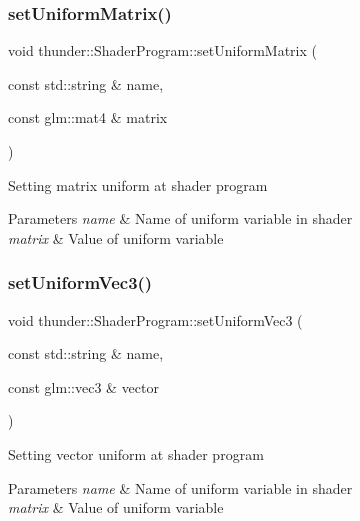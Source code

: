 \subsubsection{\texorpdfstring{set\+Uniform\+Matrix()}{setUniformMatrix()}}
{\footnotesize\ttfamily void thunder\+::\+Shader\+Program\+::set\+Uniform\+Matrix (\begin{DoxyParamCaption}\item[{const std\+::string \&}]{name,  }\item[{const glm\+::mat4 \&}]{matrix }\end{DoxyParamCaption})}

Setting matrix uniform at shader program


\begin{DoxyParams}{Parameters}
{\em name} & Name of uniform variable in shader \\
\hline
{\em matrix} & Value of uniform variable \\
\hline
\end{DoxyParams}
\mbox{\label{classthunder_1_1_shader_program_a88bff19b426a37bb610434be19e07d12}} 
\subsubsection{\texorpdfstring{set\+Uniform\+Vec3()}{setUniformVec3()}}
{\footnotesize\ttfamily void thunder\+::\+Shader\+Program\+::set\+Uniform\+Vec3 (\begin{DoxyParamCaption}\item[{const std\+::string \&}]{name,  }\item[{const glm\+::vec3 \&}]{vector }\end{DoxyParamCaption})}

Setting vector uniform at shader program


\begin{DoxyParams}{Parameters}
{\em name} & Name of uniform variable in shader \\
\hline
{\em matrix} & Value of uniform variable \\
\hline
\end{DoxyParams}
\mbox{\label{classthunder_1_1_shader_program_a1ef3d2a9d475859d53b60d8999c02068}} 
